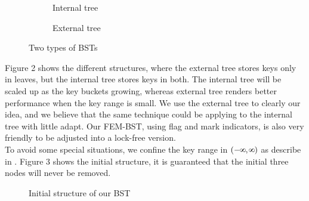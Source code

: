 \documentclass{article}
\def\infinity{\rotatebox{90}{8}}
\begin{document}
\begin{figure}[htbp]
 
\begin{subfigure}{0.5\textwidth}
\centering
{}
\caption{Internal tree}
\label{fig:subim1}
\end{subfigure}
\begin{subfigure}{0.5\textwidth}
\centering
{}
\caption{External tree}
\label{fig:subim2}
\end{subfigure}
 
\caption{Two types of BSTs}
\label{fig:image2}
\end{figure}
Figure 2 shows the different structures, where the external tree stores keys only in leaves, but the internal tree stores keys in both. The internal tree will be scaled up as the key buckets growing, whereas external tree renders better performance when the key range is small\cite{ramachandran2015castle}. We use the external tree to clearly our idea, and we believe that the same technique could be applying to the internal tree with little adapt. Our FEM-BST, using flag and mark indicators, is also very friendly to be adjusted into a lock-free version. \\
To avoid some special situations, we confine the key range  in $(-\infinity, \infinity)$ as describe in \cite{ellen2010non}. Figure 3 shows the initial structure, it is guaranteed that the initial three nodes will never be removed.
\begin{figure}[htbp]
\centering
{}
\caption{Initial structure of our BST}
\label{fig:my_label5}
\end{figure}
\end{document}
